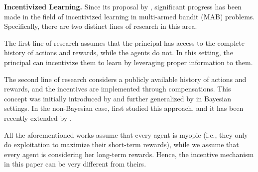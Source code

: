     \textbf{Incentivized Learning.} 
    Since its proposal by \cite{frazier2014incentivizing, kremer2014implementing}, significant progress has been made in the field of incentivized learning in multi-armed bandit (MAB) problems. Specifically, there are two distinct lines of research in this area. 

    The first line of research \cite{kremer2014implementing, mansour2015bayesian, mansour2016bayesian, immorlica2018incentivizing} assumes that the principal has access to the complete history of actions and rewards, while the agents do not. In this setting, the principal can incentivize them to learn by leveraging proper information to them.
    
    The second line of research considers a publicly available history of actions and rewards, and the incentives are implemented through compensations. This concept was initially introduced by \cite{frazier2014incentivizing} and further generalized by \cite{han2015incentivizing} in Bayesian settings. In the non-Bayesian case,  \cite{wang2018multi} first studied this approach, and it has been recently extended by \cite{wang2021incentivizing}.
        
    

    All the aforementioned works assume that every agent is myopic (i.e., they only do exploitation to maximize their short-term rewards), while we assume that every agent is considering her long-term rewards. 
    Hence, the incentive mechanism in this paper can be very different from theirs. 
  


   
    
    
